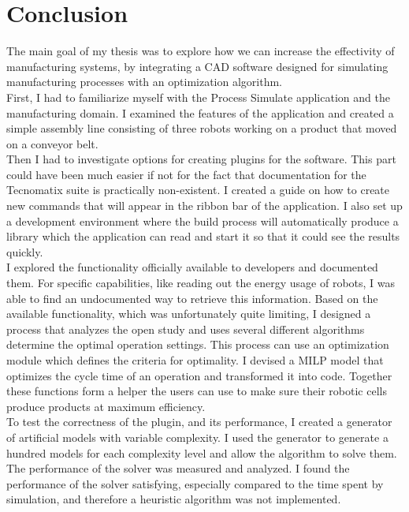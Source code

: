 \chapter{Conclusion}
\label{ch:conclusion}
\graphicspath{{chapters/Conclusion/}}

The main goal of my thesis was to explore how we can increase the effectivity of manufacturing systems, by integrating a CAD software designed for simulating manufacturing processes with an optimization algorithm. \\

First, I had to familiarize myself with the Process Simulate application and the manufacturing domain. I examined the features of the application and created a simple assembly line consisting of three robots working on a product that moved on a conveyor belt. \\

Then I had to investigate options for creating plugins for the software. This part could have been much easier if not for the fact that documentation for the Tecnomatix suite is practically non-existent. I created a guide on how to create new commands that will appear in the ribbon bar of the application. I also set up a development environment where the build process will automatically produce a library which the application can read and start it so that it could see the results quickly. \\

I explored the functionality officially available to developers and documented them. For specific capabilities, like reading out the energy usage of robots, I was able to find an undocumented way to retrieve this information. Based on the available functionality, which was unfortunately quite limiting, I designed a process that analyzes the open study and uses several different algorithms determine the optimal operation settings. This process can use an optimization module which defines the criteria for optimality. I devised a MILP model that optimizes the cycle time of an operation and transformed it into code. Together these functions form a helper the users can use to make sure their robotic cells produce products at maximum efficiency. \\

To test the correctness of the plugin, and its performance, I created a generator of artificial models with variable complexity. 
I used the generator to generate a hundred models for each complexity level and allow the algorithm to solve them. The performance of the solver was measured and analyzed. I found the performance of the solver satisfying, especially compared to the time spent by simulation, and therefore a heuristic algorithm was not implemented. \\


